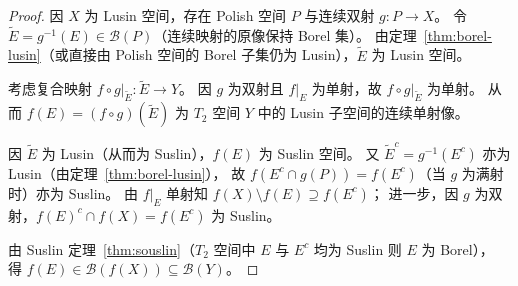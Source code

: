 \documentclass[lang=cn,a4paper,newtx,figureplace=section,tableplace=section]{elegantbook}
\begin{document}
\begin{proof}
  因 $X$ 为 Lusin 空间，存在 Polish 空间 $P$ 与连续双射 $g:P\to X$。
  令 $\widetilde{E}=g^{-1}(E)\in\mathcal{B}(P)$（连续映射的原像保持 Borel 集）。
  由定理~\ref{thm:borel-lusin}（或直接由 Polish 空间的 Borel 子集仍为 Lusin），$\widetilde{E}$ 为 Lusin 空间。

  考虑复合映射 $f\circ g|_{\widetilde{E}}:\widetilde{E}\to Y$。
  因 $g$ 为双射且 $f|_E$ 为单射，故 $f\circ g|_{\widetilde{E}}$ 为单射。
  从而 $f(E)=(f\circ g)(\widetilde{E})$ 为 $T_2$ 空间 $Y$ 中的 Lusin 子空间的连续单射像。

  因 $\widetilde{E}$ 为 Lusin（从而为 Suslin），$f(E)$ 为 Suslin 空间。
  又 $\widetilde{E}^c=g^{-1}(E^c)$ 亦为 Lusin（由定理~\ref{thm:borel-lusin}），
  故 $f(E^c\cap g(P))=f(E^c)$（当 $g$ 为满射时）亦为 Suslin。
  由 $f|_E$ 单射知 $f(X)\setminus f(E)\supseteq f(E^c)$；
  进一步，因 $g$ 为双射，$f(E)^c\cap f(X)=f(E^c)$ 为 Suslin。

  由 Suslin 定理~\ref{thm:souslin}（$T_2$ 空间中 $E$ 与 $E^c$ 均为 Suslin 则 $E$ 为 Borel），
  得 $f(E)\in\mathcal{B}(f(X))\subseteq\mathcal{B}(Y)$。
\end{proof}
\end{document}
